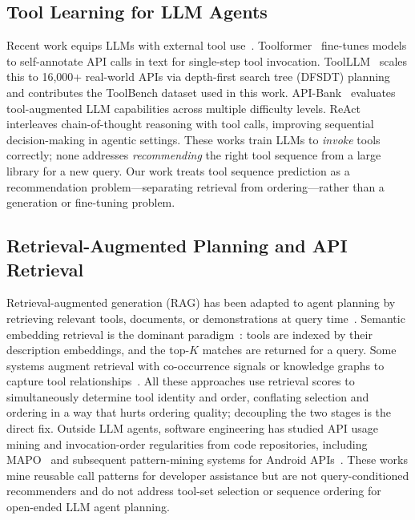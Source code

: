 \documentclass[lettersize,journal]{IEEEtran}
\begin{document}
\subsection{Tool Learning for LLM Agents}

Recent work equips LLMs with external tool use~\cite{toolsurvey,toolsurvey2025}.
Toolformer~\cite{toolformer} fine-tunes models to self-annotate API calls in text for single-step tool invocation.
ToolLLM~\cite{toolllm} scales this to 16,000+ real-world APIs via depth-first search tree (DFSDT) planning and contributes the ToolBench dataset used in this work.
API-Bank~\cite{apibank} evaluates tool-augmented LLM capabilities across multiple difficulty levels.
ReAct~\cite{react} interleaves chain-of-thought reasoning with tool calls, improving sequential decision-making in agentic settings.
These works train LLMs to \emph{invoke} tools correctly; none addresses \emph{recommending} the right tool sequence from a large library for a new query.
Our work treats tool sequence prediction as a recommendation problem---separating retrieval from ordering---rather than a generation or fine-tuning problem.

\subsection{Retrieval-Augmented Planning and API Retrieval}

Retrieval-augmented generation (RAG) has been adapted to agent planning by retrieving relevant tools, documents, or demonstrations at query time~\cite{rag}.
Semantic embedding retrieval is the dominant paradigm~\cite{sentencetransformers,dpr,huggingface}: tools are indexed by their description embeddings, and the top-$K$ matches are returned for a query.
Some systems augment retrieval with co-occurrence signals or knowledge graphs to capture tool relationships~\cite{toolllm}.
All these approaches use retrieval scores to simultaneously determine tool identity and order, conflating selection and ordering in a way that hurts ordering quality; decoupling the two stages is the direct fix.
Outside LLM agents, software engineering has studied API usage mining and invocation-order regularities from code repositories, including MAPO~\cite{mapo} and subsequent pattern-mining systems for Android APIs~\cite{androidpatterns}.
These works mine reusable call patterns for developer assistance but are not query-conditioned recommenders and do not address tool-set selection or sequence ordering for open-ended LLM agent planning.
\end{document}
